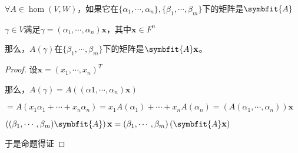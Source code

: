 \documentclass[12pt, a4paper, oneside, UTF8]{ctexbook}
\begin{document}
\begin{para}{0}
\begin{proposition}
						$\forall A \in \hom(V,W)$，如果它在$\{\alpha _1,\cdots,\alpha _n\},\{\beta _1,\cdots,\beta _m\}$下的矩阵是$\symbfit{A}$

						$\gamma \in V$满足$\gamma =(\alpha_1,\cdots,\alpha_n)\mathbf{x}$，其中$\mathbf{x} \in F^n$

						那么，$A(\gamma )$在$\{\beta_1,\cdots,\beta_m\}$下的矩阵是$\symbfit{A}\mathbf{x}$。
					\end{proposition}
					\begin{proof}
						设$\mathbf{x} = (x_1,\cdots,x_n)^T$

						那么，$A(\gamma )=A\left((\alpha 1,\cdots,\alpha _n)\mathbf{x}\right)$

						$=A(x_1\alpha _1+\cdots+x_n\alpha _n)=x_1A(\alpha _1)+\cdots+x_nA(\alpha _n)=\left(A(\alpha _1,\cdots,\alpha _n)\right)\mathbf{x}$

						$\left((\beta_1,\cdots,\beta_m)\symbfit{A}\right)\mathbf{x}=(\beta_1,\cdots,\beta_m)\left(\symbfit{A}\mathbf{x}\right)$

						于是命题得证
					\end{proof}
			\end{para}
\end{document}
